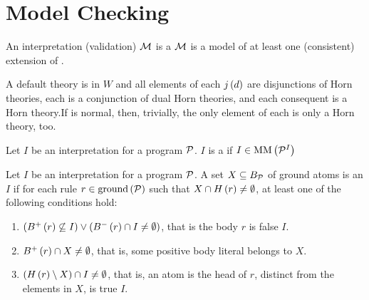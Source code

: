 \section{Model Checking}

\begin{defi}
An interpretation (validation) $\mathcal{M}$ is a  \iffTx{} $\mathcal{M}$ is a model of at least one (consistent) extension of .
\cite{conf/ijcai/BaumgartnerG99}
\end{defi}

\begin{defi}
A default theory  is in  \iffTx{} $W$ and all elements of each $j\left(d\right)$ are disjunctions of Horn theories, each  is a conjunction of dual Horn theories, and each consequent  is a Horn theory.If  is normal, then, trivially, the only element of each  is only a Horn theory, too.
\cite{conf/ijcai/BaumgartnerG99}
\end{defi}

\begin{defi}%
Let $I$ be an interpretation for a program $\mathcal{P}$. $I$ is a  if $I\in\mbox{MM}\left(\mathcal{P}^I\right)$
\cite{conf/ijcai/KochL99}
\end{defi}

\begin{defi}
Let $I$ be an interpretation for a program $\mathcal{P}$. A set $X\subseteq B_{\mathcal{P}}$ of ground atoms is an  \wrtTx{} $I$ if for each rule $r\in\mbox{ground}\left(\mathcal{P}\right)$ such that $X\cap H\left(r\right)\neq\emptyset$, at least one of the following conditions hold:
\begin{enumerate}
 \item $\left( B^+\left(r\right)\not\subseteq I\right)\vee\left( B^-\left(r\right)\cap I\neq\emptyset\right)$, that is the body $r$ is false \wrtTx{} $I$.
 \item $B^+\left(r\right)\cap X\neq\emptyset$, that is, some positive body literal belongs to $X$.
 \item $\left( H\left(r\right)\setminus X\right)\cap I\neq\emptyset$, that is, an atom is the head of $r$, distinct from the elements in $X$, is true \wrtTx{} $I$.
\end{enumerate}
\cite{conf/ijcai/KochL99}
\end{defi}

